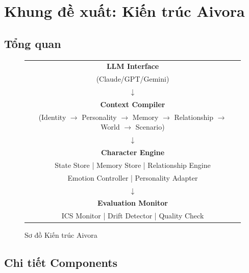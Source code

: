 \documentclass[10pt,leqno]{amsart}
\begin{document}

\section{Khung đề xuất: Kiến trúc Aivora}

\subsection{Tổng quan}

\begin{figure}[H]
\centering
\caption{Sơ đồ Kiến trúc Aivora}
\label{fig:architecture}
\begin{tabular}{c}
\toprule
\multicolumn{1}{c}{\textbf{LLM Interface}} \\
\multicolumn{1}{c}{(Claude/GPT/Gemini)} \\
\midrule
$\downarrow$ \\
\multicolumn{1}{c}{\textbf{Context Compiler}} \\
\multicolumn{1}{c}{(Identity $\to$ Personality $\to$ Memory $\to$ Relationship $\to$ World $\to$ Scenario)} \\
\midrule
$\downarrow$ \\
\multicolumn{1}{c}{\textbf{Character Engine}} \\
\multicolumn{1}{c}{State Store | Memory Store | Relationship Engine} \\
\multicolumn{1}{c}{Emotion Controller | Personality Adapter} \\
\midrule
$\downarrow$ \\
\multicolumn{1}{c}{\textbf{Evaluation Monitor}} \\
\multicolumn{1}{c}{ICS Monitor | Drift Detector | Quality Check} \\
\bottomrule
\end{tabular}
\end{figure}

\subsection{Chi tiết Components}
\end{document}

